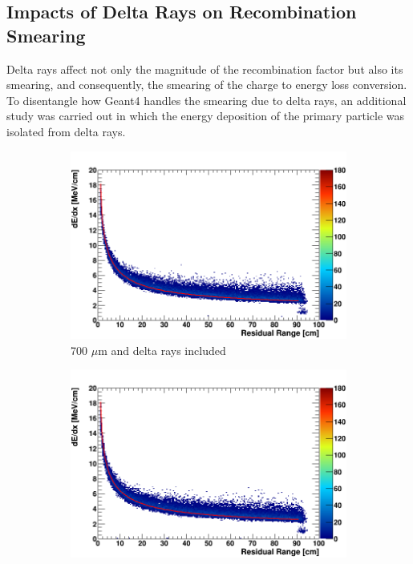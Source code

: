 \subsection{Impacts of Delta Rays on Recombination Smearing}
\label{sec:impactDeltaRaySmear}

Delta rays affect not only the magnitude of the recombination factor but also its smearing, and consequently, the smearing of the charge to energy loss conversion.
To disentangle how Geant4 handles the smearing due to delta rays, an additional study was carried out in which the energy deposition of the primary particle was isolated from delta rays. 

\begin{figure}[b!]
        \begin{subfigure}[b]{0.495\textwidth}   
            \centering 
            \includegraphics[width=\textwidth]{derr_proton_delta_700um}
            \caption{700 $\mu$m and delta rays included}%
            \label{fig:derr_proton_delta_700}
        \end{subfigure}
        \hfill
        \begin{subfigure}[b]{0.495\textwidth}   
            \centering 
            \includegraphics[width=\textwidth]{derr_proton_delta_1um}

\end{subfigure}
\end{figure}
